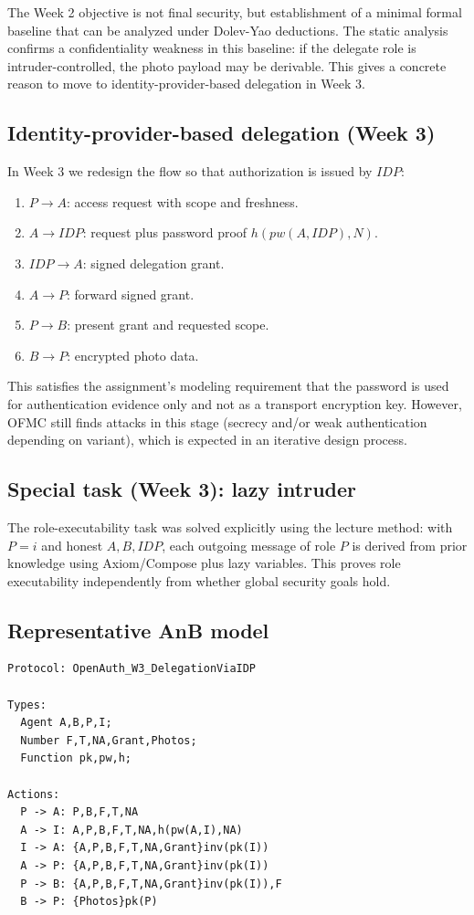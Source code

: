 \documentclass[11pt,a4paper]{article}
\begin{document}
The Week 2 objective is not final security, but establishment of a minimal
formal baseline that can be analyzed under Dolev-Yao deductions.
The static analysis confirms a confidentiality weakness in this baseline:
if the delegate role is intruder-controlled, the photo payload may be derivable.
This gives a concrete reason to move to identity-provider-based delegation in Week 3.

\subsection{Identity-provider-based delegation (Week 3)}

In Week 3 we redesign the flow so that authorization is issued by $\mathit{IDP}$:
\begin{enumerate}
  \item $P \rightarrow A$: access request with scope and freshness.
  \item $A \rightarrow \mathit{IDP}$: request plus password proof $h(pw(A,\mathit{IDP}),N)$.
  \item $\mathit{IDP} \rightarrow A$: signed delegation grant.
  \item $A \rightarrow P$: forward signed grant.
  \item $P \rightarrow B$: present grant and requested scope.
  \item $B \rightarrow P$: encrypted photo data.
\end{enumerate}

This satisfies the assignment's modeling requirement that the password is used
for authentication evidence only and not as a transport encryption key.
However, OFMC still finds attacks in this stage (secrecy and/or weak authentication depending on variant),
which is expected in an iterative design process.

\subsection{Special task (Week 3): lazy intruder}

The role-executability task was solved explicitly using the lecture method:
with $P=i$ and honest $A,B,\mathit{IDP}$, each outgoing message of role $P$
is derived from prior knowledge using Axiom/Compose plus lazy variables.
This proves role executability independently from whether global security goals hold.

\subsection{Representative AnB model}
\begin{lstlisting}
Protocol: OpenAuth_W3_DelegationViaIDP

Types:
  Agent A,B,P,I;
  Number F,T,NA,Grant,Photos;
  Function pk,pw,h;

Actions:
  P -> A: P,B,F,T,NA
  A -> I: A,P,B,F,T,NA,h(pw(A,I),NA)
  I -> A: {A,P,B,F,T,NA,Grant}inv(pk(I))
  A -> P: {A,P,B,F,T,NA,Grant}inv(pk(I))
  P -> B: {A,P,B,F,T,NA,Grant}inv(pk(I)),F
  B -> P: {Photos}pk(P)
\end{lstlisting}
\end{document}
